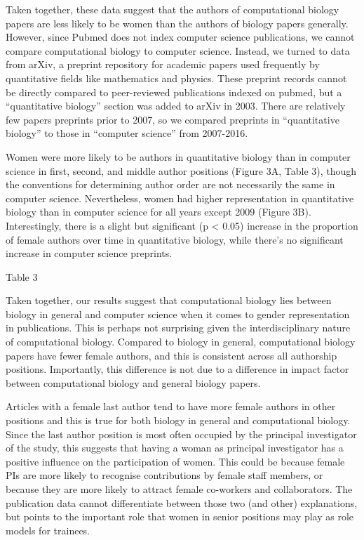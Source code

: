 \documentclass[11pt]{article}
\begin{document}
Taken together, these data suggest that the authors of computational biology papers are less likely to be women than the authors of biology papers generally. However, since Pubmed does not index computer science publications, we cannot compare computational biology to computer science. Instead, we turned to data from arXiv, a preprint repository for academic papers used frequently by quantitative fields like mathematics and physics. These preprint records cannot be directly compared to peer-reviewed publications indexed on pubmed, but a “quantitative biology” section was added to arXiv in 2003. There are relatively few papers preprints prior to 2007, so we compared preprints in “quantitative biology” to those in “computer science” from 2007-2016.

Women were more likely to be authors in quantitative biology than in computer science in first, second, and middle author positions (Figure 3A, Table 3), though the conventions for determining author order are not necessarily the same in computer science. Nevertheless, women had higher representation in quantitative biology than in computer science for all years except 2009 (Figure 3B). Interestingly, there is a slight but significant (p < 0.05) increase in the proportion of female authors over time in quantitative biology, while there’s no significant increase in computer science preprints.

Table 3

Taken together, our results suggest that computational biology lies between biology in general and computer science when it comes to gender representation in publications. This is perhaps not surprising given the interdisciplinary nature of computational biology. Compared to biology in general, computational biology papers have fewer female authors, and this is consistent across all authorship positions. Importantly, this difference is not due to a difference in impact factor between computational biology and general biology papers.

Articles with a female last author tend to have more female authors in other positions and this is true for both biology in general and computational biology.  Since the last author position is most often occupied by the principal investigator of the study, this suggests that having a woman as principal investigator has a positive influence on the participation of women. This could be because female PIs are more likely to recognise contributions by female staff members, or because they are more likely to attract female co-workers and collaborators. The publication data cannot differentiate between those two (and other) explanations, but points to the important role that women in senior positions may play as role models for trainees.
\end{document}
